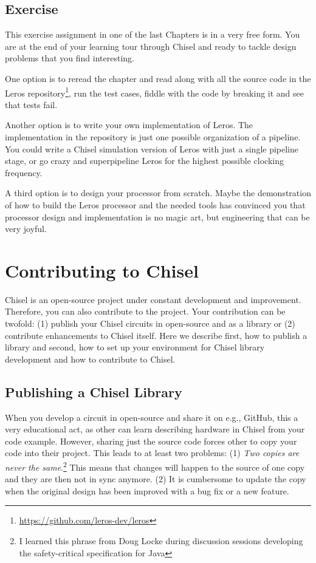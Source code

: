 \documentclass[%
    10pt,
    headinclude, footexclude,
    openright, %
    notitlepage,
    cleardoubleempty,
    headsepline,
    pointlessnumbers,
    bibtotoc, idxtotoc,
    ]{scrbook}
\newcommand{\myref}[2]{\href{#1}{#2}}
\renewcommand{\myref}[2]{{#2}{\footnote{\url{#1}}}}
\begin{document}

\section{Exercise}

This exercise assignment in one of the last Chapters is in a very free form. You are at the end
of your learning tour through Chisel and ready to tackle design problems that
you find interesting.

One option is to reread the chapter and read along with all the source code in the
\myref{https://github.com/leros-dev/leros}{Leros repository}, run the test cases,
fiddle with the code by breaking it and see that tests fail.

Another option is to write your own implementation of Leros.
The implementation in the repository is just one possible organization of a pipeline.
You could write a Chisel simulation version of Leros with just a single pipeline stage,
or go crazy and superpipeline Leros for the highest possible clocking frequency.

A third option is to design your processor from scratch. Maybe the demonstration of
how to build the Leros processor and the needed tools has convinced you that processor
design and implementation is no magic art, but engineering that can be very joyful.

\chapter{Contributing to Chisel}


Chisel is an open-source project under constant development and improvement.
Therefore, you can also contribute to the project. Your contribution can be twofold:
(1) publish your Chisel circuits in open-source and as a library or (2) contribute
enhancements to Chisel itself.
Here we describe first, how to publish a library and second, how to
set up your environment for Chisel library development and how to contribute
to Chisel.

\section{Publishing a Chisel Library}

When you develop a circuit in open-source and share it on e.g., GitHub,
this a very educational act, as other can learn describing hardware in Chisel from your code example.
However, sharing just the source code forces other to copy your code into their
project. This leads to at least two problems: (1) \emph{Two copies are never the
same}.\footnote{I learned this phrase from Doug Locke during discussion sessions
developing the safety-critical specification for Java} This means that changes will
happen to the source of one copy and they are then not in sync anymore.
(2) It is cumbersome to update the copy when the original design has been improved
with a bug fix or a new feature.
\end{document}
